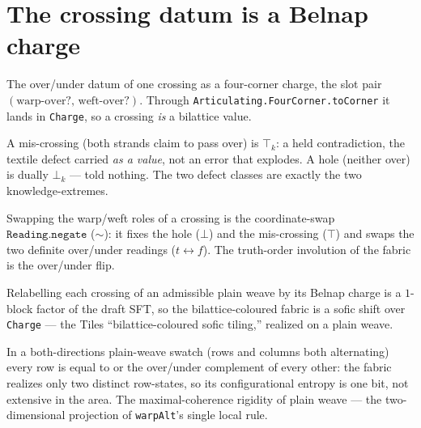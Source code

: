 \section{The crossing datum is a Belnap charge}

\begin{proposition}\label{thm:crossing-charge}\leanok{}
The over/under datum of one crossing as a four-corner charge, the slot pair
$(\text{warp-over?},\,\text{weft-over?})$. Through \texttt{Articulating.FourCorner.toCorner} it lands in
\texttt{Charge}, so a crossing \emph{is} a bilattice value.
\end{proposition}

\begin{theorem}\label{thm:miscrossing-top}\leanok{}
A mis-crossing (both strands claim to pass over) is $\top_k$: a held contradiction, the
textile defect carried \emph{as a value}, not an error that explodes. A hole (neither over)
is dually $\bot_k$ --- told nothing. The two defect classes are exactly the two
knowledge-extremes.
\end{theorem}

\begin{theorem}\label{thm:overunder-negate}\leanok{}
Swapping the warp/weft roles of a crossing is the coordinate-swap $\texttt{Reading.negate}$
($\sim$): it fixes the hole ($\bot$) and the mis-crossing ($\top$) and swaps the two
definite over/under readings ($t \leftrightarrow f$). The truth-order involution of the
fabric is the over/under flip.
\end{theorem}

\begin{theorem}\label{thm:charge-coloured-sofic}\leanok{}
Relabelling each crossing of an admissible plain weave by its Belnap charge is a $1$-block
factor of the draft SFT, so the bilattice-coloured fabric is a sofic shift over
\texttt{Charge} --- the Tiles ``bilattice-coloured sofic tiling,'' realized on a plain
weave.
\end{theorem}

\begin{theorem}\label{thm:weave-entropy-collapse}\leanok{}
In a both-directions plain-weave swatch (rows and columns both alternating) every row is
equal to or the over/under complement of every other: the fabric realizes only two distinct
row-states, so its configurational entropy is one bit, not extensive in the area. The
maximal-coherence rigidity of plain weave --- the two-dimensional projection of \texttt{warpAlt}'s
single local rule.
\end{theorem}
